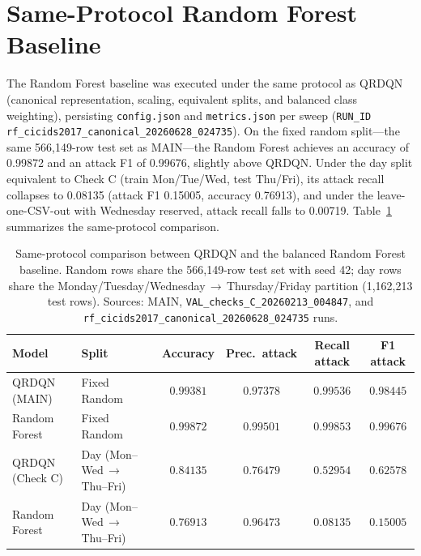 \section{Same-Protocol Random Forest Baseline}
\label{sec:rf}
The Random Forest baseline was executed under the same protocol as QRDQN (canonical representation, scaling, equivalent splits, and balanced class weighting), persisting \texttt{config.json} and \texttt{metrics.json} per sweep (\texttt{RUN\_ID} \texttt{rf\_cicids2017\_canonical\_20260628\_024735}). On the fixed random split---the same 566,149-row test set as MAIN---the Random Forest achieves an accuracy of 0.99872 and an attack F1 of 0.99676, slightly above QRDQN. Under the day split equivalent to Check C (train Mon/Tue/Wed, test Thu/Fri), its attack recall collapses to 0.08135 (attack F1 0.15005, accuracy 0.76913), and under the leave-one-CSV-out with Wednesday reserved, attack recall falls to 0.00719. Table~\ref{tab:rf-vs-qrdqn} summarizes the same-protocol comparison.

\begin{table}[htbp]
\centering
\begin{tabular}{llcccc}
\toprule
Model & Split & Accuracy & Prec.\ attack & Recall attack & F1 attack \\
\midrule
QRDQN (MAIN) & Fixed Random & $0.99381$ & $0.97378$ & $0.99536$ & $0.98445$ \\
Random Forest & Fixed Random & $0.99872$ & $0.99501$ & $0.99853$ & $0.99676$ \\
\midrule
QRDQN (Check C) & Day (Mon--Wed\,$\rightarrow$\,Thu--Fri) & $0.84135$ & $0.76479$ & $0.52954$ & $0.62578$ \\
Random Forest & Day (Mon--Wed\,$\rightarrow$\,Thu--Fri) & $0.76913$ & $0.96473$ & $0.08135$ & $0.15005$ \\
\bottomrule
\end{tabular}
\caption{Same-protocol comparison between QRDQN and the balanced Random Forest baseline. Random rows share the 566,149-row test set with seed 42; day rows share the Monday/Tuesday/Wednesday\,$\rightarrow$\,Thursday/Friday partition (1,162,213 test rows). Sources: MAIN, \texttt{VAL\_checks\_C\_20260213\_004847}, and \texttt{rf\_cicids2017\_canonical\_20260628\_024735} runs.}
\label{tab:rf-vs-qrdqn}
\end{table}

